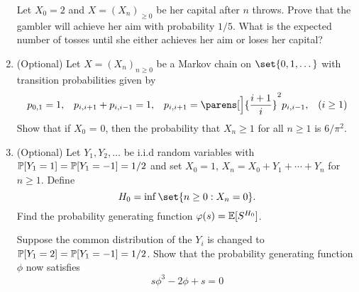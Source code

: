 \documentclass[a4paper,12pt]{article}
\begin{document}
\begin{enumerate}[label=\arabic*.,leftmargin=*]
  Let \(X_0 = 2\) and \(X = (X_n)_{\ge 0}\) be her capital after \(n\) throws.
  Prove that the gambler will achieve her aim with probability \(1/5\). What is
  the expected number of tosses until she either achieves her aim or loses her
  capital?
 \item (Optional)
  Let \(X = (X_n)_{n \ge 0}\) be a Markov chain on \(\set{0, 1, \dotsc}\) with
  transition probabilities given by
  \begin{align*}
   p_{0,1} = 1, &&
   p_{i,i+1} + p_{i,i-1} = 1, &&
   p_{i,i+1} = \parens[\Big]{\frac{i + 1}i}^2 p_{i,i-1},&&
   (i \ge 1)
  \end{align*}
  Show that if \(X_0\) = 0, then the probability that \(X_n \ge 1\) for all
  \(n \ge 1\) is \(6/\pi^2\).
 \item (Optional)
  Let \(Y_1, Y_2, \dotsc\) be i.i.d random variables with
  \(\mathbb P[Y_1 = 1] = \mathbb P[Y_1 = -1] = 1/2\) and set
  \(X_0 = 1\), \(X_n = X_0 + Y_1 + \dotsb + Y_n\) for \(n \ge 1\). Define
  \begin{equation*}
   H_0 = \inf \set{n \ge 0: X_n = 0}.
  \end{equation*}
  Find the probability generating function \(\varphi(s) = \mathbb E[S^{H_0}]\).

  Suppose the common distribution of the \(Y_i\) is changed to
  \mbox{\(\mathbb P[Y_1 = 2] = \mathbb P[Y_1 = -1] = 1/2\)}. Show that the probability
  generating function \(\phi\) now satisfies
  \begin{equation*}
   s\phi^3 - 2\phi + s = 0
  \end{equation*}
\end{enumerate}
\end{document}
